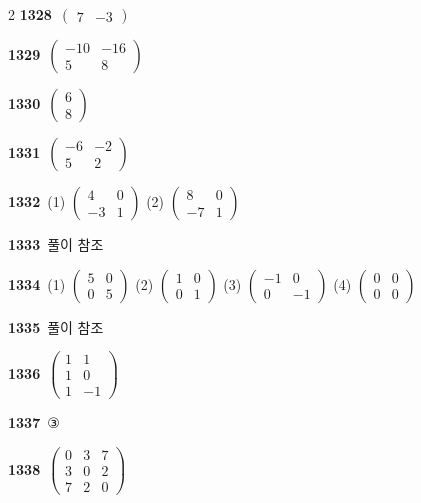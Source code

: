 \documentclass[10pt,a4paper]{article}
\begin{document}
\begin{multicols}{2}
\noindent\textbf{1328}\ $\begin{pmatrix} 7 & -3 \end{pmatrix}$\par
\noindent\textbf{1329}\ $\begin{pmatrix} -10 & -16 \\ 5 & 8 \end{pmatrix}$\par
\noindent\textbf{1330}\ $\begin{pmatrix} 6 \\ 8 \end{pmatrix}$\par
\noindent\textbf{1331}\ $\begin{pmatrix} -6 & -2 \\ 5 & 2 \end{pmatrix}$\par
\noindent\textbf{1332}\ (1) $\begin{pmatrix} 4 & 0 \\ -3 & 1 \end{pmatrix}$ (2) $\begin{pmatrix} 8 & 0 \\ -7 & 1 \end{pmatrix}$\par
\noindent\textbf{1333}\ 풀이 참조\par
\noindent\textbf{1334}\ (1) $\begin{pmatrix} 5 & 0 \\ 0 & 5 \end{pmatrix}$ (2) $\begin{pmatrix} 1 & 0 \\ 0 & 1 \end{pmatrix}$ (3) $\begin{pmatrix} -1 & 0 \\ 0 & -1 \end{pmatrix}$ (4) $\begin{pmatrix} 0 & 0 \\ 0 & 0 \end{pmatrix}$\par
\noindent\textbf{1335}\ 풀이 참조\par
\noindent\textbf{1336}\ $\begin{pmatrix} 1 & 1 \\ 1 & 0 \\ 1 & -1 \end{pmatrix}$\par
\noindent\textbf{1337}\ ③\par
\noindent\textbf{1338}\ $\begin{pmatrix} 0 & 3 & 7 \\ 3 & 0 & 2 \\ 7 & 2 & 0 \end{pmatrix}$\par

\end{multicols}
\end{document}
